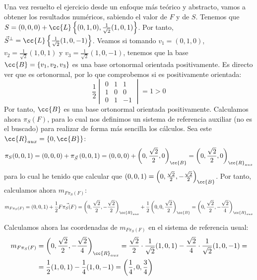 \begin{ejercicio}
    Una vez resuelto el ejercicio desde un enfoque más teórico y abstracto, vamos a obtener los resultados numéricos, sabiendo el valor de $F$ y de $S$.
    Tenemos que $S=(0,0,0) + \cc{L}\left\{(0,1,0), \frac{1}{\sqrt{2}}(1,0,1)\right\}$. Por tanto, $\vec{S}^\perp=\cc{L}\left\{\frac{1}{\sqrt{2}}(1,0,-1)\right\}$.
    Veamos si tomando $v_1=(0,1,0)$, $v_2=\frac{1}{\sqrt{2}}(1,0,1)$ y $v_3=\frac{1}{\sqrt{2}}(1,0,-1)$, tenemos que la base $\cc{B}=\{v_1,v_2,v_3\}$ es una base ortonormal orientada positivamente.
    Es directo ver que es ortonormal, por lo que comprobemos si es positivamente orientada:
    \begin{equation*}
        \frac{1}{2}\begin{vmatrix}
            0 & 1 & 1 \\
            1 & 0 & 0 \\
            0 & 1 & -1
        \end{vmatrix} = 1 > 0
    \end{equation*}
    Por tanto, $\cc{B}$ es una base ortonormal orientada positivamente. Calculamos ahora $\pi_S(F)$, para lo cual nos definimos un sistema de referencia auxiliar (no es el buscado) para
    realizar de forma más sencilla los cálculos. Sea este $\cc{R}_{aux}=\{0,\cc{B}\}$:
    \begin{equation*}
        \pi_S(0,0,1) = (0,0,0) + \pi_{\vec{S}} \left(0,0,1\right) = (0,0,0) + \left(0, \frac{\sqrt{2}}{2}, 0\right)_{\cc{B}} = \left(0, \frac{\sqrt{2}}{2}, 0\right)_{\cc{R}_{aux}}
    \end{equation*}
    para lo cual he tenido que calcular que $(0,0,1)=\left(0, \frac{\sqrt{2}}{2}, -\frac{\sqrt{2}}{2}\right)_{\cc{B}}$. Por tanto, calculamos ahora $m_{F \pi_S(F)}$:
    \begin{equation*}
        m_{F \pi_S(F)} = (0,0,1) + \frac{1}{2}\vec{F\pi_S(F)} = \left(0, \frac{\sqrt{2}}{2}, -\frac{\sqrt{2}}{2}\right)_{\cc{R}_{aux}} + \frac{1}{2}\left(0, 0, \frac{\sqrt{2}}{2}\right)_{\cc{B}} = \left(0, \frac{\sqrt{2}}{2}, -\frac{\sqrt{2}}{4}\right)_{\cc{R}_{aux}}
    \end{equation*}

    Calculamos ahora las coordenadas de $m_{F \pi_S(F)}$ en el sistema de referencia usual:
    \begin{align*}
        m_{F \pi_S(F)} &= \left(0, \frac{\sqrt{2}}{2}, -\frac{\sqrt{2}}{4}\right)_{\cc{R}_{aux}}
        = \frac{\sqrt{2}}{2}\cdot \frac{1}{\sqrt{2}}(1,0,1) - \frac{\sqrt{2}}{4}\cdot \frac{1}{\sqrt{2}}(1,0,-1) =\\&
        = \frac{1}{2}(1,0,1) - \frac{1}{4}(1,0,-1) = \left(\frac{1}{4}, 0, \frac{3}{4}\right)
    \end{align*}


\end{ejercicio}
